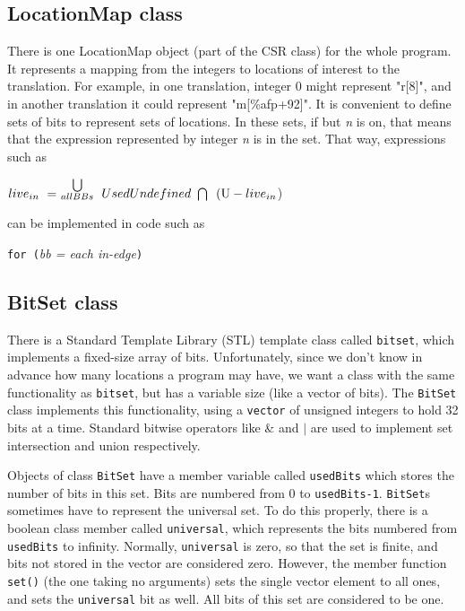 \subsection{LocationMap class}

There is one LocationMap object (part of the CSR class) for the whole program.
It represents a mapping from the integers to locations of interest to the
translation. For example, in one translation, integer 0 might represent "r[8]",
and in another translation it could represent "m[\%afp+92]". It is convenient
to define sets of bits to represent sets of locations. In these sets, if
but {\it n} is on, that means that the expression represented by integer {\it n}
is in the set. That way, expressions such as

  $live_{in}~ = ~\stackrel{\bigcup}{_{all BBs}} ~UsedUndefined~ \bigcap
  ~~({\rm U} - live_{in}$)

can be implemented in code such as

    {\tt for (}{\it bb = each in-edge}{\tt )} \\

\subsection{BitSet class}

There is a Standard Template Library (STL) template class called
\texttt{bitset}, which implements a fixed-size array of bits. Unfortunately,
since we don't know in advance how many locations a program may have, we want a
class with the same functionality as \texttt{bitset}, but has a variable size
(like a vector of bits).  The \texttt{BitSet} class implements this
functionality, using a \texttt{vector} of unsigned integers to hold 32 bits
at a time. Standard bitwise operators like \& and $|$ are used to implement
set intersection and union respectively.

Objects of class \texttt{BitSet} have a member variable called \texttt{usedBits}
which stores the number of bits in this set.
Bits are numbered from 0 to \texttt{usedBits-1}.
\texttt{BitSet}s sometimes have to represent the universal set.
To do this properly, there is a boolean class member called \texttt{universal},
which represents the bits numbered from \texttt{usedBits} to infinity.
Normally, \texttt{universal} is zero, so that the set is finite, and bits
not stored in the vector are considered zero. However, the member function
\texttt{set()} (the one taking no arguments) sets the single vector element
to all ones, and sets the \texttt{universal} bit as well. All bits of this
set are considered to be one.

